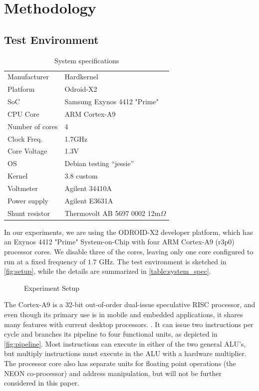 \section{Methodology}

\subsection{Test Environment}
\begin{table}
    \begin{tabular}{l|l}
        \hline
        \hline
    Manufacturer    & Hardkernel\\
    Platform        & Odroid-X2\\
    SoC             & Samsung Exynos 4412 "Prime"\\
    CPU Core        & ARM Cortex-A9\\
    Number of cores & 4\\
    Clock Freq.     & 1.7GHz\\
    Core Voltage    & 1.3V\\
    OS              & Debian testing ``jessie''\\
    Kernel          & 3.8 custom\\
        \hline
        \hline
    Voltmeter       & Agilent 34410A\\
    Power supply    & Agilent E3631A\\
    Shunt resistor  & Thermovolt AB 5697 0002 12m$\Omega$\\
        \hline
        \hline
    \end{tabular}
    \caption{System specifications}
    \label{table:system_spec}
\end{table}

In our experiments, we are using the ODROID-X2 \cite{odroid-x2} developer
platform, which has an Exynos 4412 "Prime" System-on-Chip with four ARM
Cortex-A9 (r3p0) processor cores. We disable three of the cores, leaving only
one core configured to run at a fixed frequency of $1.7$ GHz. The test
environment is sketched in \autoref{fig:setup}, while the details are summarized in
\autoref{table:system_spec}.

\begin{figure}
    
    \caption{Experiment Setup}
    \label{fig:setup}
\end{figure}

The Cortex-A9 is a 32-bit out-of-order dual-issue speculative RISC processor,
and even though its primary use is in mobile and embedded applications, it
shares many features with current desktop processors. \cite{patterson}
\cite{hennessy}. It can issue two instructions per cycle and branches its
pipeline to four functional units, as depicted in \autoref{fig:pipeline}. Most
instructions can execute in either of the two general ALU's, but multiply
instructions must execute in the ALU with a hardware multiplier. The processor
core also has separate units for floating point operations (the NEON
co-processor) and address manipulation, but will not be further considered in
this paper.

